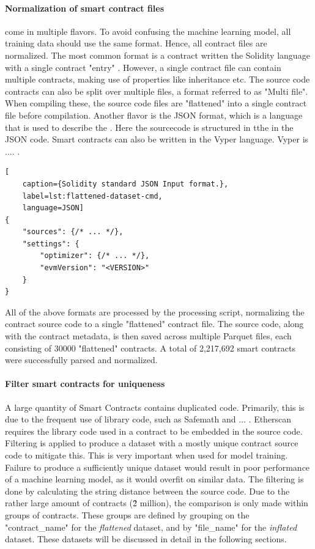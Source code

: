 \paragraph{Normalization of smart contract files}
\label{par:normalization}
 come in multiple flavors. To avoid confusing the machine learning model, all training data should use the same format. Hence, all contract files are normalized. The most common format is a contract written the Solidity language with a single contract "entry"  . However, a single contract file can contain multiple contracts, making use of properties like inheritance etc. The source code contracts can also be split over multiple files, a format referred to as "Multi file". When compiling these, the source code files are "flattened" into a single contract file before compilation. Another flavor is the JSON format, which is a language that is used to describe the . Here the sourcecode is structured in tthe in the JSON code. Smart contracts can also be written in the Vyper language. Vyper is .... .


\begin{lstlisting}[
    caption={Solidity standard JSON Input format.},
    label=lst:flattened-dataset-cmd,
    language=JSON]
{
    "sources": {/* ... */},
    "settings": {
        "optimizer": {/* ... */},
        "evmVersion": "<VERSION>"
    }
}
\end{lstlisting}

All of the above formats are processed by the processing script, normalizing the contract source code to a single "flattened" contract file. The source code, along with the contract metadata, is then saved across multiple Parquet files, each consisting of 30000 "flattened" contracts. A total of 2,217,692 smart contracts were successfully parsed and normalized.

\paragraph{Filter smart contracts for uniqueness}
\label{sec:duplication-filtering}
A large quantity of Smart Contracts contains duplicated code. Primarily, this is due to the frequent use of library code, such as Safemath and ... . Etherscan requires the library code used in a contract to be embedded in the source code. Filtering is applied to produce a dataset with a mostly unique contract source code to mitigate this. This is very important when used for model training. Failure to produce a sufficiently unique dataset would result in poor performance of a machine learning model, as it would overfit on similar data. The filtering is done by calculating the string distance between the source code. Due to the rather large amount of contracts (\~2 million), the comparison is only made within groups of contracts. These groups are defined by grouping on the "contract\_name" for the \textit{flattened} dataset, and by "file\_name" for the \textit{inflated} dataset. These datasets will be discussed in detail in the following sections.

